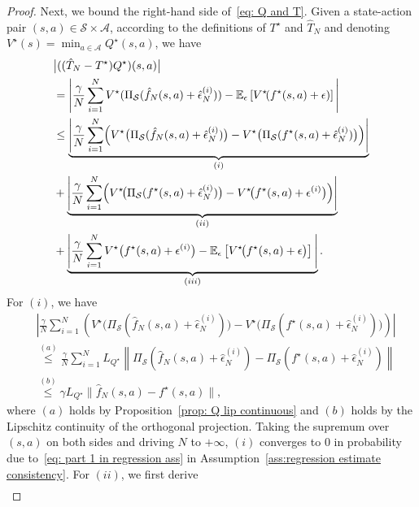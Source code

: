 \documentclass[10pt,a4paper]{amsart}
\begin{document}
\begin{proof}
Next, we bound the right-hand side of\ \eqref{eq: Q and T}. Given a state-action pair $(s,a)\in\mathcal S\times\mathcal A$, according to the definitions of $T^\star$ and $\hat{T}_N$ and denoting $V^\star(s)=\min_{a\in\mathcal A}Q^\star(s,a)$, we have
\footnotesize
\begin{align*}
&\bigl|((\hat{T}_N-T^\star)Q^\star)(s,a)\bigr| \\
&=\Bigg|
\frac{\gamma}{N}\sum_{i=1}^{N}V^\star(\Pi_{\mathcal{S}}(\hat f_N(s,a)+\hat\epsilon_N^{(i)}))
- \mathbb E_\epsilon\left[V^\star\!(f^\star(s,a)+\epsilon)\right]
\Bigg|\nonumber \\
&\le \underbrace{\Bigg|
\frac{\gamma}{N}\sum_{i=1}^{N}\Bigl(
V^\star\bigl(\Pi_{\mathcal{S}}(\hat f_N(s,a)+\hat\epsilon_N^{(i)})\bigr)
-V^\star\bigl(\Pi_{\mathcal S}(f^\star(s,a)+\hat\epsilon_N^{(i)})\bigr)
\Bigr)\Bigg|}_{(i)}\\
& + \underbrace{\Bigg|
\frac{\gamma}{N}\sum_{i=1}^{N}\Bigl(
V^\star\!\bigl( \Pi_{\mathcal S}(f^\star(s,a)+\hat\epsilon_N^{(i)})\bigr)
-V^\star\!\bigl(f^\star(s,a)+\epsilon^{(i)}\bigr)
\Bigr)\Bigg|}_{(ii)}\\
& +\underbrace{ \Bigg|
\frac{\gamma}{N}\sum_{i=1}^{N}V^\star\bigl(f^\star(s,a)+\epsilon^{(i)}\bigr)
-\mathbb E_\epsilon\left[V^\star\!\bigl(f^\star(s,a)+\epsilon\bigr)\right]
\Bigg|}_{(iii)}.
\end{align*}
\normalsize
For $(i)$, we have
\allowdisplaybreaks
\small 
\begin{align}
& \left| \frac{\gamma}{N} \sum_{i=1}^N \left(
V^\star\!\bigl(\Pi_{\mathcal S}(\hat f_N(s,a)+\hat\epsilon_N^{(i)})\bigr)
-V^\star\bigl(\Pi_{\mathcal S}(f^\star(s,a)+\hat\epsilon_N^{(i)})\bigr)\right)
\right|\nonumber\\
 & \overset{(a)}{\le} \frac{\gamma}{N} \sum_{i=1}^N  L_{Q^\star}\left\|\Pi_{\mathcal S}(\hat f_N(s,a)+\hat\epsilon_N^{(i)}) - \Pi_{\mathcal S}(f^\star(s,a)+\hat\epsilon_N^{(i)})\right\| \nonumber \\
& \overset{(b)}{\le} \gamma L_{Q^\star}\|\hat f_N(s,a)-f^\star(s,a)\|,\nonumber
\end{align}
\normalsize
where $(a)$ holds by Proposition\ \ref{prop: Q lip continuous} and $(b)$ holds by the Lipschitz continuity of the orthogonal projection. Taking the supremum over $(s,a)$ on both sides and driving $N$ to $+\infty$, $(i)$ converges to $0$ in probability due to\ \eqref{eq: part 1 in regression ass} in Assumption\ \ref{ass:regression estimate consistency}.
For $(ii)$, we first derive 
\begin{align}\label{eq:hat epsilon - epsilon}

\end{align}
\end{proof}
\end{document}
